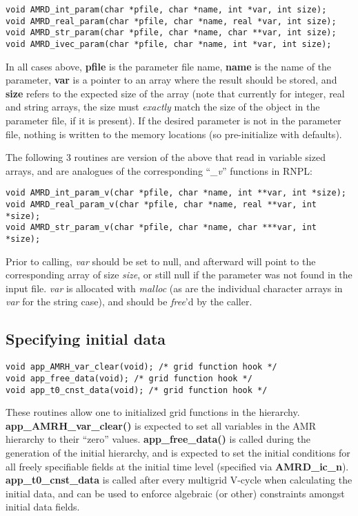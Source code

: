 \documentclass[aps,amssymb,unsortedaddress,nofootinbib]{revtex4}
\begin{document}
\begin{verbatim}
void AMRD_int_param(char *pfile, char *name, int *var, int size);
void AMRD_real_param(char *pfile, char *name, real *var, int size);
void AMRD_str_param(char *pfile, char *name, char **var, int size);
void AMRD_ivec_param(char *pfile, char *name, int *var, int size);
\end{verbatim}

In all cases above, {\bf pfile} is the parameter file name,
{\bf name} is the name of the parameter, {\bf var} is a pointer
to an array where the result should be stored, and {\bf size}
refers to the expected size of the array (note that currently
for integer, real and string arrays, the size must {\em exactly}
match the size of the object in the parameter file, if it is present). If the desired
parameter is not in the parameter file, nothing is written to the
memory locations (so pre-initialize with defaults).

The following 3 routines are version of the above that read
in variable sized arrays, and are analogues of the corresponding
``{\em \_v}'' functions in RNPL:

\begin{verbatim}
void AMRD_int_param_v(char *pfile, char *name, int **var, int *size);
void AMRD_real_param_v(char *pfile, char *name, real **var, int *size);
void AMRD_str_param_v(char *pfile, char *name, char ***var, int *size);
\end{verbatim}

Prior to calling, {\em var} should be set to null, and afterward
will point to the corresponding array of size {\em size}, or
still null if the parameter was not found in the input file.
{\em var} is allocated with {\em malloc} (as are the 
individual character arrays in {\em var} for the string 
case), and should be {\em free}'d by the caller.

\subsection{Specifying initial data}

\begin{verbatim}
void app_AMRH_var_clear(void); /* grid function hook */
void app_free_data(void); /* grid function hook */
void app_t0_cnst_data(void); /* grid function hook */
\end{verbatim}

These routines allow one to initialized grid functions in the hierarchy.
{\bf app\_AMRH\_var\_clear()} is expected to set all variables
in the AMR hierarchy to their ``zero'' values. {\bf app\_free\_data()}
is called during the generation of the initial hierarchy, and
is expected to set the initial conditions for all freely specifiable
fields at the initial time level (specified via {\bf AMRD\_ic\_n}). 
{\bf app\_t0\_cnst\_data} is called after every multigrid V-cycle
when calculating the initial data, and can be used to enforce
algebraic (or other) constraints amongst initial data fields.
\end{document}
